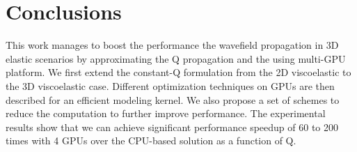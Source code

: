 \documentclass{paris17}
\begin{document}
\section{Conclusions}

This work manages to boost the performance the wavefield propagation in 3D elastic scenarios by approximating the Q propagation and the using multi-GPU platform. We first extend the constant-Q formulation from the 2D viscoelastic to the 3D viscoelastic case. Different optimization techniques on GPUs are then described for an efficient modeling kernel. We also propose a set of schemes to reduce the computation to further improve performance. The experimental results show that we can achieve significant performance speedup of 60 to 200 times with 4 GPUs over the CPU-based solution as a function of Q.


\end{document}

